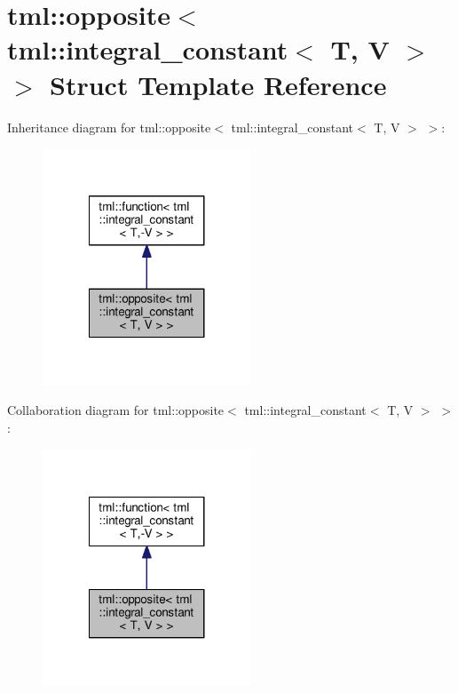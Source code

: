 \hypertarget{structtml_1_1opposite_3_01tml_1_1integral__constant_3_01_t_00_01_v_01_4_01_4}{\section{tml\+:\+:opposite$<$ tml\+:\+:integral\+\_\+constant$<$ T, V $>$ $>$ Struct Template Reference}
\label{structtml_1_1opposite_3_01tml_1_1integral__constant_3_01_t_00_01_v_01_4_01_4}
}


Inheritance diagram for tml\+:\+:opposite$<$ tml\+:\+:integral\+\_\+constant$<$ T, V $>$ $>$\+:
\nopagebreak
\begin{figure}[H]
\begin{center}
\leavevmode
\includegraphics[width=176pt]{structtml_1_1opposite_3_01tml_1_1integral__constant_3_01_t_00_01_v_01_4_01_4__inherit__graph}
\end{center}
\end{figure}


Collaboration diagram for tml\+:\+:opposite$<$ tml\+:\+:integral\+\_\+constant$<$ T, V $>$ $>$\+:
\nopagebreak
\begin{figure}[H]
\begin{center}
\leavevmode
\includegraphics[width=176pt]{structtml_1_1opposite_3_01tml_1_1integral__constant_3_01_t_00_01_v_01_4_01_4__coll__graph}
\end{center}
\end{figure}
